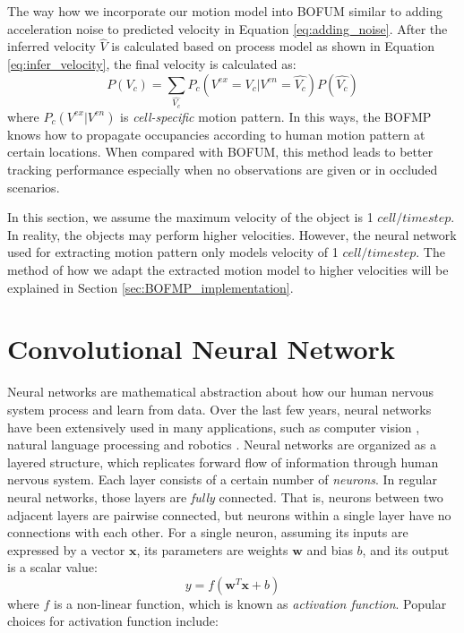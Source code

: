 The way how we incorporate our motion model into BOFUM similar to adding acceleration noise to predicted velocity in Equation \ref{eq:adding_noise}. After the inferred velocity $\hat{V}$ is calculated based on process model as shown in Equation \ref{eq:infer_velocity}, the final velocity is calculated as:
\begin{equation}
P(V_c) = \sum_{\hat{V_c}}{P_c(V^{ex}=V_c|V^{en}=\hat{V_c})P(\hat{V_c})} \label{eq:motion_pattern}
\end{equation}
where $P_c(V^{ex}|V^{en})$ is \textit{cell-specific} motion pattern. In this ways, the BOFMP knows how to propagate occupancies according to human motion pattern at certain locations. When compared with BOFUM, this method leads to better tracking performance especially when no observations are given or in occluded scenarios.

In this section, we assume the maximum velocity of the object is 1 $cell/timestep$. In reality, the objects may perform higher velocities. However, the neural network used for extracting motion pattern only models velocity of 1 $cell/timestep$. The method of how we adapt the extracted motion model to higher velocities will be explained in Section \ref{sec:BOFMP_implementation}.

\section{Convolutional Neural Network} \label{sec:cnn}

Neural networks are mathematical abstraction about how our human nervous system process and learn from data. Over the last few years, neural networks have been extensively used in many applications, such as computer vision \citep{russakovsky2015imagenet}, natural language processing \citep{cho2014learning} and robotics \citep{levine2016learning}. Neural networks are organized as a layered structure, which replicates forward flow of information through human nervous system. Each layer consists of a certain number of \textit{neurons}. In regular neural networks, those layers are \textit{fully} connected. That is, neurons between two adjacent layers are pairwise connected, but neurons within a single layer have no connections with each other. For a single neuron, assuming its inputs are expressed by a vector $\mathbf{x}$, its parameters are weights $\mathbf{w}$ and bias $b$, and its output is a scalar value:
\begin{equation}
y = f(\mathbf{w}^T \mathbf{x} + b)
\end{equation}
where $f$ is a non-linear function, which is known as \textit{activation function}. Popular choices for activation function include:

